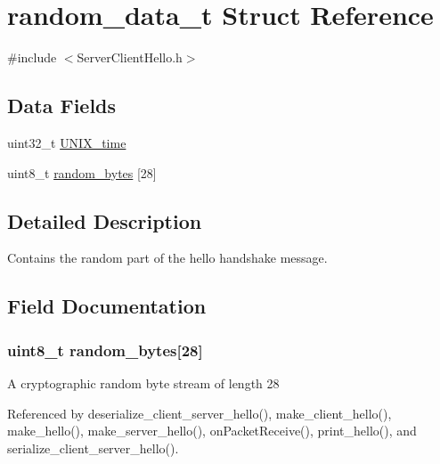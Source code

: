 \hypertarget{structrandom__data__t}{}\section{random\+\_\+data\+\_\+t Struct Reference}
\label{structrandom__data__t}


{\ttfamily \#include $<$Server\+Client\+Hello.\+h$>$}

\subsection*{Data Fields}
\begin{DoxyCompactItemize}
\item 
uint32\+\_\+t \hyperlink{structrandom__data__t_a905c3cf8e7be80f2a3255f99c3ee2fb4}{U\+N\+I\+X\+\_\+time}
\item 
uint8\+\_\+t \hyperlink{structrandom__data__t_a179340bb108f00eb9461163551bb9051}{random\+\_\+bytes} \mbox{[}28\mbox{]}
\end{DoxyCompactItemize}


\subsection{Detailed Description}
Contains the random part of the hello handshake message. 

\subsection{Field Documentation}
\subsubsection[{\texorpdfstring{random\+\_\+bytes}{random_bytes}}]{\setlength{\rightskip}{0pt plus 5cm}uint8\+\_\+t random\+\_\+bytes\mbox{[}28\mbox{]}}\hypertarget{structrandom__data__t_a179340bb108f00eb9461163551bb9051}{}\label{structrandom__data__t_a179340bb108f00eb9461163551bb9051}
A cryptographic random byte stream of length 28 

Referenced by deserialize\+\_\+client\+\_\+server\+\_\+hello(), make\+\_\+client\+\_\+hello(), make\+\_\+hello(), make\+\_\+server\+\_\+hello(), on\+Packet\+Receive(), print\+\_\+hello(), and serialize\+\_\+client\+\_\+server\+\_\+hello().

